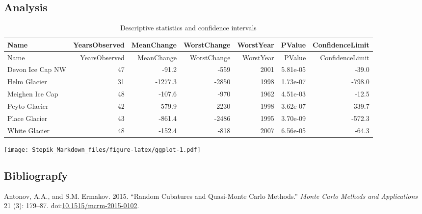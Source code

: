 \documentclass[]{article}
\begin{document}
\subsection{Analysis}\label{analysis}

\begin{longtable}[]{@{}lrrrrrr@{}}
\caption{Descriptive statistics and confidence intervals}\tabularnewline
\toprule
Name & YearsObserved & MeanChange & WorstChange & WorstYear & PValue &
ConfidenceLimit\tabularnewline
\midrule
\endfirsthead
\toprule
Name & YearsObserved & MeanChange & WorstChange & WorstYear & PValue &
ConfidenceLimit\tabularnewline
\midrule
\endhead
Devon Ice Cap NW & 47 & -91.2 & -559 & 2001 & 5.81e-05 &
-39.0\tabularnewline
Helm Glacier & 31 & -1277.3 & -2850 & 1998 & 1.73e-07 &
-798.0\tabularnewline
Meighen Ice Cap & 48 & -107.6 & -970 & 1962 & 4.51e-03 &
-12.5\tabularnewline
Peyto Glacier & 42 & -579.9 & -2230 & 1998 & 3.62e-07 &
-339.7\tabularnewline
Place Glacier & 43 & -861.4 & -2486 & 1995 & 3.70e-09 &
-572.3\tabularnewline
White Glacier & 48 & -152.4 & -818 & 2007 & 6.56e-05 &
-64.3\tabularnewline
\bottomrule
\end{longtable}

\texttt{[image: Stepik\_Markdown\_files/figure-latex/ggplot-1.pdf]}

\subsection*{Bibliograpfy}\label{bibliograpfy}

\hypertarget{refs}{}
\hypertarget{ref-AntonovErmakov_RandsmCubaturesQMC}{}
Antonov, A.A., and S.M. Ermakov. 2015. ``Random Cubatures and
Quasi-Monte Carlo Methods.'' \emph{Monte Carlo Methods and Applications}
21 (3): 179--87.
doi:\href{https://doi.org/10.1515/mcrm-2015-0102}{10.1515/mcrm-2015-0102}.
\end{document}
